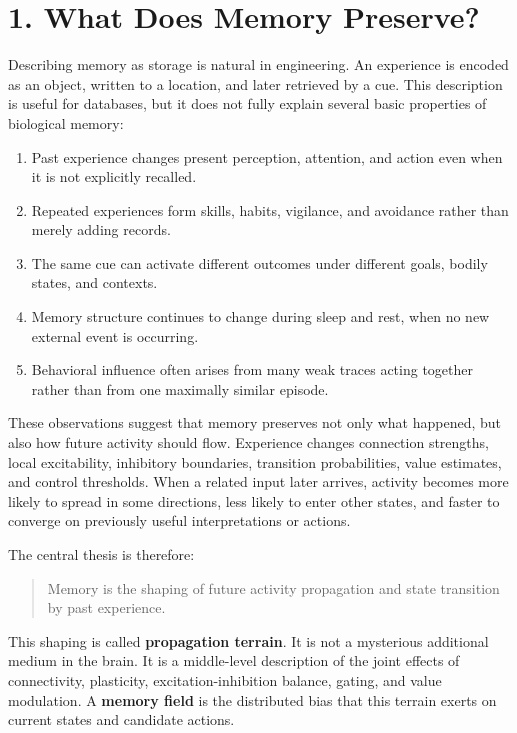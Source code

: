 \documentclass[11pt, a4paper]{article}
\begin{document}
\section{1. What Does Memory Preserve?}

Describing memory as storage is natural in engineering. An experience is encoded as an object, written to a location, and later retrieved by a cue. This description is useful for databases, but it does not fully explain several basic properties of biological memory:

\begin{enumerate}
\item Past experience changes present perception, attention, and action even when it is not explicitly recalled.
\item Repeated experiences form skills, habits, vigilance, and avoidance rather than merely adding records.
\item The same cue can activate different outcomes under different goals, bodily states, and contexts.
\item Memory structure continues to change during sleep and rest, when no new external event is occurring.
\item Behavioral influence often arises from many weak traces acting together rather than from one maximally similar episode.

\end{enumerate}
These observations suggest that memory preserves not only what happened, but also how future activity should flow. Experience changes connection strengths, local excitability, inhibitory boundaries, transition probabilities, value estimates, and control thresholds. When a related input later arrives, activity becomes more likely to spread in some directions, less likely to enter other states, and faster to converge on previously useful interpretations or actions.

The central thesis is therefore:

\begin{quote}
Memory is the shaping of future activity propagation and state transition by past experience.
\end{quote}

This shaping is called \textbf{propagation terrain}. It is not a mysterious additional medium in the brain. It is a middle-level description of the joint effects of connectivity, plasticity, excitation-inhibition balance, gating, and value modulation. A \textbf{memory field} is the distributed bias that this terrain exerts on current states and candidate actions.
\end{document}
